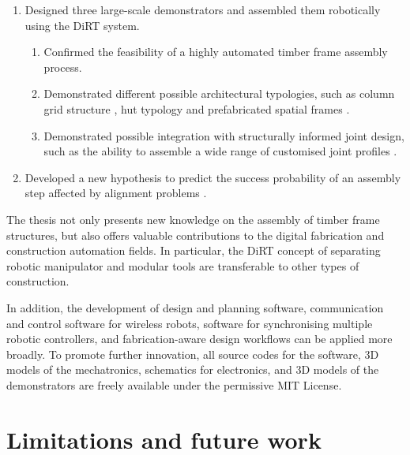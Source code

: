 \begin{enumerate}
	\item Designed three large-scale demonstrators and assembled them robotically using the DiRT system.
	\begin{enumerate}
		\item Confirmed the feasibility of a highly automated timber frame assembly process. 

		\item Demonstrated different possible architectural typologies, such as column grid structure , hut typology  and prefabricated spatial frames .

		\item Demonstrated possible integration with structurally informed joint design, such as the ability to assemble a wide range of customised joint profiles .
	\end{enumerate}

	\item Developed a new hypothesis to predict the success probability of an assembly step affected by alignment problems .

\end{enumerate}

The thesis not only presents new knowledge on the assembly of timber frame structures, but also offers valuable contributions to the digital fabrication and construction automation fields. In particular, the DiRT concept of separating robotic manipulator and modular tools are transferable to other types of construction. 

In addition, the development of design and planning software, communication and control software for wireless robots, software for synchronising multiple robotic controllers, and fabrication-aware design workflows can be applied more broadly. To promote further innovation, all source codes for the software, 3D models of the mechatronics, schematics for electronics, and 3D models of the demonstrators are freely available under the permissive MIT License. 

\section{Limitations and future work}
\label{section:limitations}

